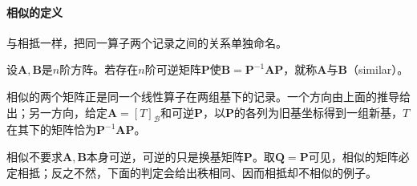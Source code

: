 \paragraph{相似的定义}
\label{sec:ls-similarity-meaning}
与相抵一样，把同一算子两个记录之间的关系单独命名。
\begin{definition}[矩阵相似]
\label{def:ls-matrix-similarity}
设$\bm A,\bm B$是$n$阶方阵。若存在$n$阶可逆矩阵$\bm P$使$\bm B=\bm P^{-1}\bm A\bm P$，就称$\bm A$与$\bm B$（similar）。
\end{definition}
相似的两个矩阵正是同一个线性算子在两组基下的记录。一个方向由上面的推导给出；另一方向，给定$\bm A=[T]_{\mathcal B}$和可逆$\bm P$，以$\bm P$的各列为旧基坐标得到一组新基，$T$在其下的矩阵恰为$\bm P^{-1}\bm A\bm P$。

相似不要求$\bm A,\bm B$本身可逆，可逆的只是换基矩阵$\bm P$。取$\bm Q=\bm P$可见，相似的矩阵必定相抵；反之不然，下面的判定会给出秩相同、因而相抵却不相似的例子。

